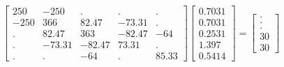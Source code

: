 \begin{equation}
\begin{bmatrix}
250 & -250 & . & . & . \\
-250 & 366 & 82.47 & -73.31 & . \\
. & 82.47 & 363 & -82.47 & -64 \\
. & -73.31 & -82.47 & 73.31 & . \\
. & . & -64 & . & 85.33
\end{bmatrix}
\begin{bmatrix}
0.7031 \\
0.7031 \\
0.2531 \\
1.397 \\
0.5414
\end{bmatrix}=
\begin{bmatrix}
. \\
. \\
. \\
30 \\
30
\end{bmatrix}
\end{equation}